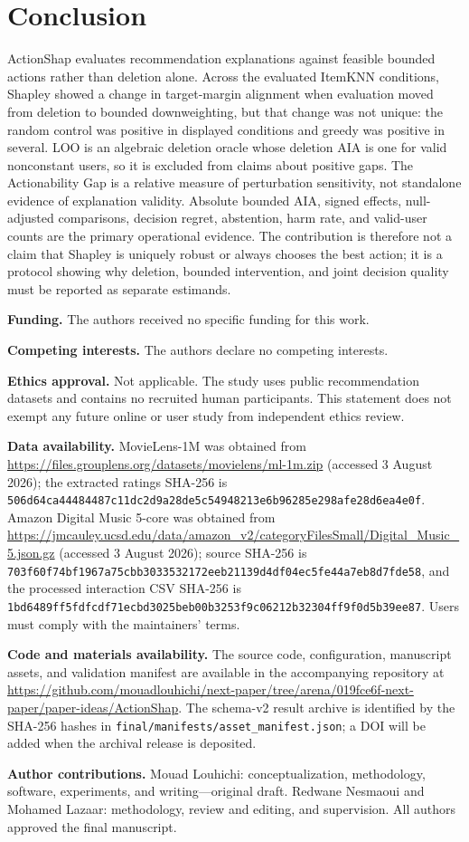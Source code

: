 \documentclass[pdflatex,sn-basic]{sn-jnl}
\begin{document}
\section{Conclusion}
ActionShap evaluates recommendation explanations against feasible bounded actions rather than deletion alone. Across the evaluated ItemKNN conditions, Shapley showed a change in target-margin alignment when evaluation moved from deletion to bounded downweighting, but that change was not unique: the random control was positive in displayed conditions and greedy was positive in several. LOO is an algebraic deletion oracle whose deletion AIA is one for valid nonconstant users, so it is excluded from claims about positive gaps. The Actionability Gap is a relative measure of perturbation sensitivity, not standalone evidence of explanation validity. Absolute bounded AIA, signed effects, null-adjusted comparisons, decision regret, abstention, harm rate, and valid-user counts are the primary operational evidence. The contribution is therefore not a claim that Shapley is uniquely robust or always chooses the best action; it is a protocol showing why deletion, bounded intervention, and joint decision quality must be reported as separate estimands.

\textbf{Funding.} The authors received no specific funding for this work.

\textbf{Competing interests.} The authors declare no competing interests.

\textbf{Ethics approval.} Not applicable. The study uses public recommendation datasets and contains no recruited human participants. This statement does not exempt any future online or user study from independent ethics review.

\textbf{Data availability.} MovieLens-1M was obtained from \url{https://files.grouplens.org/datasets/movielens/ml-1m.zip} (accessed 3 August 2026); the extracted ratings SHA-256 is \texttt{506d64ca44484487c11dc2d9a28de5c54948213e6b96285e298afe28d6ea4e0f}. Amazon Digital Music 5-core was obtained from \url{https://jmcauley.ucsd.edu/data/amazon_v2/categoryFilesSmall/Digital_Music_5.json.gz} (accessed 3 August 2026); source SHA-256 is \texttt{703f60f74bf1967a75cbb3033532172eeb21139d4df04ec5fe44a7eb8d7fde58}, and the processed interaction CSV SHA-256 is \texttt{1bd6489ff5fdfcdf71ecbd3025beb00b3253f9c06212b32304ff9f0d5b39ee87}. Users must comply with the maintainers' terms.

\textbf{Code and materials availability.} The source code, configuration, manuscript assets, and validation manifest are available in the accompanying repository at \url{https://github.com/mouadlouhichi/next-paper/tree/arena/019fce6f-next-paper/paper-ideas/ActionShap}. The schema-v2 result archive is identified by the SHA-256 hashes in \texttt{final/manifests/asset_manifest.json}; a DOI will be added when the archival release is deposited.

\textbf{Author contributions.} Mouad Louhichi: conceptualization, methodology, software, experiments, and writing---original draft. Redwane Nesmaoui and Mohamed Lazaar: methodology, review and editing, and supervision. All authors approved the final manuscript.



\end{document}
